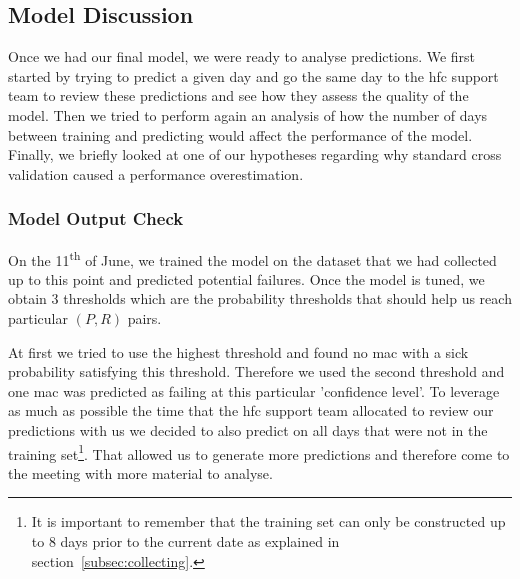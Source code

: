 \subsection{Model Discussion}
Once we had our final model, we were ready to analyse predictions. We first started by trying to predict a given day and go the same day to the \acrshort{hfc} support team to review these predictions and see how they assess the quality of the model. Then we tried to perform again an analysis of how the number of days between training and predicting would affect the performance of the model. Finally, we briefly looked at one of our hypotheses regarding why standard cross validation caused a performance overestimation.

\subsubsection{Model Output Check}
On the 11\textsuperscript{th} of June, we trained the model on the dataset that we had collected up to this point and predicted potential failures. Once the model is tuned, we obtain 3 thresholds which are the probability thresholds that should help us reach particular $(P,R)$ pairs. 

At first we tried to use the highest threshold and found no \acrshort{mac} with a sick probability satisfying this threshold. Therefore we used the second threshold and one \acrshort{mac} was predicted as failing at this particular 'confidence level'. To leverage as much as possible the time that the \acrshort{hfc} support team allocated to review our predictions with us we decided to also predict on all days that were not in the training set\footnote{It is important to remember that the training  set can only be constructed up to 8 days prior to the current date as explained in section~\ref{subsec:collecting}.}. That allowed us to generate more predictions and therefore come to the meeting with more material to analyse.

